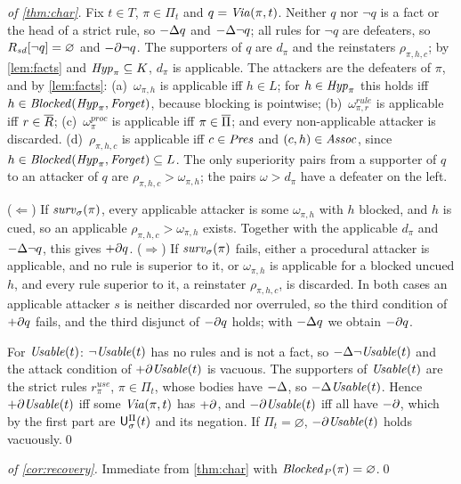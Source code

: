 \begin{proof}[of \cref{thm:char}]
Fix $t\in T$, $\pi\in\Pi_t$ and $q=\mathit{Via}(\pi,t)$. Neither $q$ nor $\neg q$ is a fact or the head of a strict rule, so $-\Delta q$ and $-\Delta\neg q$; all rules for $\neg q$ are defeaters, so $R_{\mathit{sd}}[\neg q]=\varnothing$ and $-\partial\neg q$. The supporters of $q$ are $d_\pi$ and the reinstaters $\rho_{\pi,h,c}$; by \cref{lem:facts} and $\mathit{Hyp}_\pi\subseteq K$, $d_\pi$ is applicable. The attackers are the defeaters of $\pi$, and by \cref{lem:facts}:
(a)~$\omega_{\pi,h}$ is applicable iff $h\in L$; for $h\in\mathit{Hyp}_\pi$ this holds iff $h\in\mathit{Blocked}(\mathit{Hyp}_\pi,\mathit{Forget})$, because blocking is pointwise;
(b)~$\omega^{\mathit{rule}}_{\pi,r}$ is applicable iff $r\in\overline{R}$; (c)~$\omega^{\mathit{proc}}_\pi$ is applicable iff $\pi\in\overline{\Pi}$; and every non-applicable attacker is discarded.
(d)~$\rho_{\pi,h,c}$ is applicable iff $c\in\mathit{Pres}$ and $(c,h)\in\mathit{Assoc}$, since $h\in\mathit{Blocked}(\mathit{Hyp}_\pi,\mathit{Forget})\subseteq L$.
The only superiority pairs from a supporter of $q$ to an attacker of $q$ are $\rho_{\pi,h,c}>\omega_{\pi,h}$; the pairs $\omega>d_\pi$ have a defeater on the left.

($\Leftarrow$) If $\mathit{surv}_\sigma(\pi)$, every applicable attacker is some $\omega_{\pi,h}$ with $h$ blocked, and $h$ is cued, so an applicable $\rho_{\pi,h,c}>\omega_{\pi,h}$ exists. Together with the applicable $d_\pi$ and $-\Delta\neg q$, this gives $+\partial q$.
($\Rightarrow$) If $\mathit{surv}_\sigma(\pi)$ fails, either a procedural attacker is applicable, and no rule is superior to it, or $\omega_{\pi,h}$ is applicable for a blocked uncued $h$, and every rule superior to it, a reinstater $\rho_{\pi,h,c}$, is discarded. In both cases an applicable attacker $s$ is neither discarded nor overruled, so the third condition of $+\partial q$ fails, and the third disjunct of $-\partial q$ holds; with $-\Delta q$ we obtain $-\partial q$.

For $\mathit{Usable}(t)$: $\neg\mathit{Usable}(t)$ has no rules and is not a fact, so $-\Delta\neg\mathit{Usable}(t)$ and the attack condition of $+\partial\mathit{Usable}(t)$ is vacuous. The supporters of $\mathit{Usable}(t)$ are the strict rules $r^{\mathit{use}}_\pi$, $\pi\in\Pi_t$, whose bodies have $-\Delta$, so $-\Delta\mathit{Usable}(t)$. Hence $+\partial\mathit{Usable}(t)$ iff some $\mathit{Via}(\pi,t)$ has $+\partial$, and $-\partial\mathit{Usable}(t)$ iff all have $-\partial$, which by the first part are $\mathsf{U}^{\Pi}_{\sigma}(t)$ and its negation. If $\Pi_t=\varnothing$, $-\partial\mathit{Usable}(t)$ holds vacuously.\qed
\end{proof}

\begin{proof}[of \cref{cor:recovery}]
Immediate from \cref{thm:char} with $\mathit{Blocked}_{P}(\pi)=\varnothing$.\qed
\end{proof}

